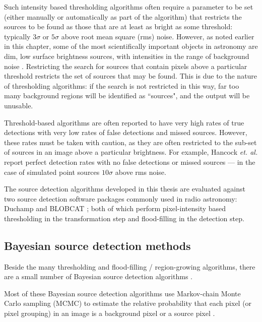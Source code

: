 Such intensity based thresholding algorithms often require a parameter to be set (either manually or automatically as part of the algorithm) that restricts the sources to be found as those that are at least as bright as some threshold: typically $3 \sigma$ or $5 \sigma$ above root mean square (rms) noise. However, as noted earlier in this chapter, some of the most scientifically important objects in astronomy are dim, low surface brightness sources, with intensities in the range of background noise \cite{norris2011emu}. Restricting the search for sources that contain pixels above a particular threshold restricts the set of sources that may be found. This is due to the nature of thresholding algorithms: if the search is not restricted in this way, far too many background regions will be identified as ``sources", and the output will be unusable.

Threshold-based algorithms are often reported to have very high rates of true detections with very low rates of false detections and missed sources. However, these rates must be taken with caution, as they are often restricted to the sub-set of sources in an image above a particular brightness. For example, Hancock \textit{et. al.} \cite{hancock2012compact} report perfect detection rates with no false detections or missed sources --- in the case of simulated point sources $10 \sigma$ above rms noise. 

The source detection algorithms developed in this thesis are evaluated against two source detection software packages commonly used in radio astronomy: Duchamp \cite{whiting2012duchamp} and BLOBCAT \cite{hales2012blobcat}; both of which perform pixel-intensity based thresholding in the transformation step and flood-filling in the detection step.

\subsection{Bayesian source detection methods}\label{sec:Bayesian-src-det}

Beside the many thresholding and flood-filling / region-growing algorithms, there are a small number of Bayesian source detection algorithms \cite{masias2012review}.

Most of these Bayesian source detection algorithms use Markov-chain Monte Carlo sampling (MCMC) to estimate the relative probability that each pixel (or pixel grouping) in an image is a background pixel or a source pixel \cite{feroz2008multimodal, masias2012review}. 


